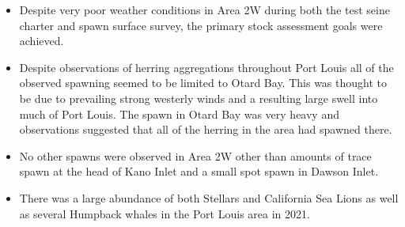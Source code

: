 \begin{itemize}
\item Despite very poor weather conditions in Area 2W
during both the test seine charter and spawn surface survey,
the primary stock assessment goals were achieved.
\item Despite observations of herring aggregations throughout Port Louis
all of the observed spawning seemed to be limited to Otard Bay.
This was thought to be due to prevailing strong westerly winds and
a resulting large swell into much of Port Louis.
The spawn in Otard Bay was very heavy and observations suggested
that all of the herring in the area had spawned there.
\item No other spawns were observed in Area 2W other than
amounts of trace spawn at the head of Kano Inlet and a small spot spawn in Dawson Inlet.
\item There was a large abundance of both Stellars and California Sea Lions
as well as several Humpback whales in the Port Louis area in 2021. 
\end{itemize}